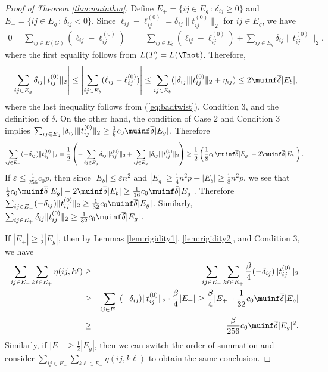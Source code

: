 \begin{proof}[Proof of Theorem \ref{thm:mainthm}]
Define $E_{+}=\{ij\in E_{g}\,:\,\delta_{ij}\ge0\}$ and $E_{-}=\{ij\in E_{g}\,:\,\delta_{ij}<0\}$.
Since $\ell_{ij}-\ell_{ij}^{(0)}=\delta_{ij}\|t_{ij}^{(0)}\|_2$
for $ij\in E_{g}$, we have 
\begin{eqnarray*}
0=\sum_{ij \in E(G)}(\ell_{ij}-\ell_{ij}^{(0)}) & = & \sum_{ij\in E_{b}}(\ell_{ij}-\ell_{ij}^{(0)})+\sum_{ij\in E_{g}}\delta_{ij}\|t_{ij}^{(0)}\|_2.
\end{eqnarray*}
where the first equality follows from $L(T) = L(\Tnot)$.  Therefore, 
\begin{eqnarray*}
	\left| \sum_{ij\in E_{g}}\delta_{ij}\|t_{ij}^{(0)}\|_2 \right|
	\le \left| \sum_{ij\in E_{b}}(\ell_{ij}-\ell_{ij}^{(0)}) \right|
	\le \sum_{ij\in E_{b}}(|\delta_{ij}|\|t_{ij}^{(0)}\|_2+\eta_{ij}) 
	\le 2\muinf\overline{\delta}|E_{b}|,
\end{eqnarray*}
where the last inequality follows from (\ref{eq:badtwist}), Condition 3, and the definition of $\overline{\delta}$. On the other hand, the condition of Case 2 and Condition 3 implies 
$\sum_{ij\in E_{g}}|\delta_{ij}|\|t_{ij}^{(0)}\|_2 \ge \frac{1}{8}c_0 \muinf\overline{\delta}|E_g|$. 
Therefore
\[
	\sum_{ij \in E_-} (-\delta_{ij}) \|t_{ij}^{(0)}\|_2
	= \frac{1}{2}\left( -\sum_{ij\in E_{g}}\delta_{ij}\|t_{ij}^{(0)}\|_2 + \sum_{ij\in E_{g}}|\delta_{ij}|\|t_{ij}^{(0)}\|_2\right)
	\ge \frac{1}{2} \left(\frac{1}{8} c_0 \muinf\overline{\delta}|E_g| - 2\muinf\overline{\delta}|E_{b}|\right).
\]
If $\varepsilon \le \frac{1}{256}c_0p$, then 
since $|E_b| \le \varepsilon n^2$ and $|E_g| \ge \frac{1}{4}n^2p - |E_b| \ge \frac{1}{8}n^2p$, 
we see that $\frac{1}{8} c_0 \muinf\overline{\delta}|E_g| - 2\muinf\overline{\delta}|E_{b}| \ge \frac{1}{16}c_0\muinf \bar{\delta}|E_g|$.
Therefore $\sum_{ij\in E_{-}}(-\delta_{ij})\|t_{ij}^{(0)}\|_2 \ge\frac{1}{32}c_{0}\muinf \overline{\delta}|E_{g}|$.
Similarly, $\sum_{ij\in E_{+}} \delta_{ij}\|t_{ij}^{(0)}\|_2 \ge \frac{1}{32}c_{0}\muinf \overline{\delta}|E_{g}|$.

If $|E_+| \ge \frac{1}{2}|E_g|$, then 
by Lemmas \ref{lem:rigidity1}, \ref{lem:rigidity2}, and Condition 3, we have 
\begin{eqnarray*}
	\sum_{ij\in E_{-}}\sum_{k\ell\in E_{+}}\eta(ij,k\ell) 
	& \ge & \sum_{ij\in E_{-}}\sum_{k\ell\in E_{+}}\frac{\beta}{4}(-\delta_{ij})\|t_{ij}^{(0)}\|_2\\
	& \ge & \sum_{ij\in E_{-}}(-\delta_{ij})\|t_{ij}^{(0)}\|_2\cdot \frac{\beta}{4}|E_{+}|
	\ge \frac{\beta}{4}|E_{+}|\cdot\frac{1}{32}c_{0}\muinf \overline{\delta}|E_{g}| \\
	& \ge & \frac{\beta}{256} c_{0} \muinf\overline{\delta}|E_{g}|^2. 
\end{eqnarray*}
Similarly, if $|E_-| \ge \frac{1}{2}|E_g|$, then we can switch the order of summation and
consider $\sum_{ij \in E_+} \sum_{k\ell \in E_-} \eta(ij, k\ell)$ to obtain the 
same conclusion.


\end{proof}
